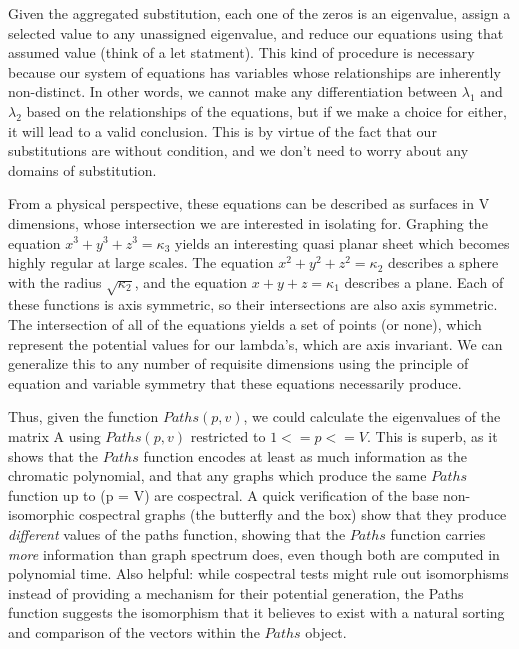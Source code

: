 \documentclass[11pt,a4paper]{report}
\begin{document}
Given the aggregated substitution, each one of the zeros is an eigenvalue, assign a selected value to any unassigned eigenvalue, and reduce our equations using that assumed value (think of a let statment).
This kind of procedure is necessary because our system of equations has variables whose relationships are inherently non-distinct.
In other words, we cannot make any differentiation between \(\lambda_1\) and \(\lambda_2\) based on the relationships of the equations, but if we make a choice for either, it will lead to a valid conclusion.
This is by virtue of the fact that our substitutions are without condition, and we don't need to worry about any domains of substitution.

From a physical perspective, these equations can be described as surfaces in V dimensions, whose intersection we are interested in isolating for. 
Graphing the equation \(x^3 + y^3 + z^3 = \kappa_3\) yields an interesting quasi planar sheet which becomes highly regular at large scales.  
The equation \(x^2 + y^2 + z^2 = \kappa_2\) describes a sphere with the radius \(\sqrt{\kappa_2}\), and the equation \(x + y + z = \kappa_1\) describes a plane. 
Each of these functions is axis symmetric, so their intersections are also axis symmetric.  
The intersection of all of the equations yields a set of points (or none), which represent the potential values for our lambda's, which are axis invariant. 
We can generalize this to any number of requisite dimensions using the principle of equation and variable symmetry that these equations necessarily produce.

Thus, given the function \(Paths(p, v)\), we could calculate the eigenvalues of the matrix A using \(Paths(p, v)\) restricted to \(1 <= p <= V\). 
This is superb, as it shows that the \(Paths\) function encodes at least as much information as the chromatic polynomial, and that any graphs which produce the same \(Paths\) function up to (p = V) are cospectral. 
A quick verification of the base non-isomorphic cospectral graphs (the butterfly and the box) show that they produce \emph{different} values of the paths function, showing that the \(Paths\) function carries \emph{more} information than graph spectrum does, even though both are computed in polynomial time. 
Also helpful: while cospectral tests might rule out isomorphisms instead of providing a mechanism for their potential generation, the Paths function suggests the isomorphism that it believes to exist with a natural sorting and comparison of the vectors within the \(Paths\) object.
\end{document}
